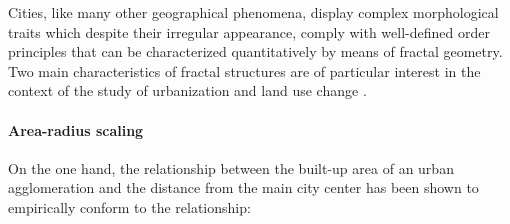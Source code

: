 \documentclass[10pt,letterpaper]{article}
\begin{document}






Cities, like many other geographical phenomena, display complex morphological traits which despite their irregular appearance, comply with well-defined order principles that can be characterized quantitatively by means of fractal geometry.
Two main characteristics of fractal structures are of particular interest in the context of the study of urbanization and land use change \cite{white2015modeling}.

\paragraph*{Area-radius scaling}
On the one hand, the relationship between the built-up area of an urban agglomeration and the distance from the main city center has been shown to empirically conform to the relationship:
\end{document}
